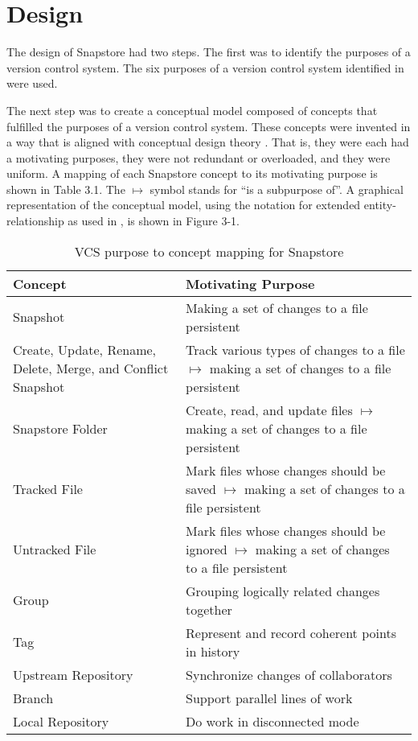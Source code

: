 \chapter{Design}

The design of Snapstore had two steps. The first was to identify the purposes of a version control system. The six purposes of a version control system identified in \cite{RossoJackson} were used.

The next step was to create a conceptual model composed of concepts that fulfilled the purposes of a version control system. These concepts were invented in a way that is aligned with conceptual design theory \cite{Jackson}. That is, they were each had a motivating purposes, they were not redundant or overloaded, and they were uniform. A mapping of each Snapstore concept to its motivating purpose is shown in Table 3.1. The $\mapsto$ symbol stands for ``is a subpurpose of''. A graphical representation of the conceptual model, using the notation for extended entity-relationship as used in \cite{Jackson}, is shown in Figure 3-1.

\vspace{6mm}

\begin{table}
\begin{tabular}{ |p{6cm}||p{9cm}|  }
 \hline
 \textbf{Concept} & \textbf{Motivating Purpose} \\[8pt]
 \hline
 Snapshot & Making a set of changes to a file persistent\\[8pt]
 Create, Update, Rename, Delete, Merge, and Conflict Snapshot & Track various types of changes to a file $\mapsto$ making a set of changes to a file persistent\\[8pt]
 Snapstore Folder & Create, read, and update files $\mapsto$ making a set of changes to a file persistent\\[8pt]
 Tracked File & Mark files whose changes should be saved $\mapsto$ making a set of changes to a file persistent\\[8pt]
 Untracked File & Mark files whose changes should be ignored $\mapsto$ making a set of changes to a file persistent\\[8pt]
 \hline
 Group & Grouping logically related changes together\\[8pt]
 Tag & Represent and record coherent points in history\\[8pt]
 \hline
 Upstream Repository & Synchronize changes of collaborators\\[8pt]
 Branch & Support parallel lines of work\\[8pt]
 Local Repository & Do work in disconnected mode\\[8pt]
 \hline
\end{tabular}
\caption{VCS purpose to concept mapping for Snapstore}
\end{table}

